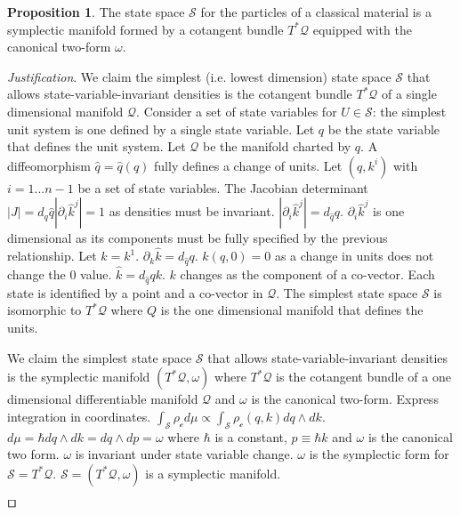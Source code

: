 \documentclass[smallextended]{svjour3}
\numberwithin{equation}{section}
\newenvironment{justification}{\emph{Justification}.}{\hfill\(\qed\)}
\theoremstyle{definition}
\newtheorem{prop}[equation]{Proposition}
\newenvironment{justification}{\emph{Justification}.}{\qed}
\begin{document}
\begin{prop}\label{prop:symplectic_manifold}
The state space $\mathcal{S}$ for the particles of a classical material is a symplectic manifold formed by a cotangent bundle $T^*\mathcal{Q}$ equipped with the canonical two-form $\omega$.
\end{prop}

\begin{justification}
	We claim the simplest (i.e. lowest dimension) state space $\mathcal{S}$ that allows state-variable-invariant densities is the cotangent bundle $T^*\mathcal{Q}$ of a single dimensional manifold $\mathcal{Q}$. Consider a set of state variables for $U \in \mathcal{S}$: the simplest unit system is one defined by a single state variable. Let $q$ be the state variable that defines the unit system. Let $\mathcal{Q}$ be the manifold charted by $q$. A diffeomorphism $\hat{q}=\hat{q}(q)$ fully defines a change of units. Let $(q,k^i)$ with $i=1...n-1$ be a set of state variables. The Jacobian determinant $|J| = d_q\hat{q} |\partial_i\hat{k}^j|=1$ as densities must be invariant. $|\partial_i \hat{k}^j| = d_{\hat{q}}q$. $\partial_i \hat{k}^j$ is one dimensional as its components must be fully specified by the previous relationship. Let $k=k^1$. $\partial_k \hat{k} = d_{\hat{q}}q$. $\hat{k}(q,0) = 0$ as a change in units does not change the $0$ value. $\hat{k} = d_{\hat{q}}q k$. $k$ changes as the component of a co-vector. Each state is identified by a point and a co-vector in $\mathcal{Q}$. The simplest state space $\mathcal{S}$ is isomorphic to $T^*\mathcal{Q}$ where $Q$ is the one dimensional manifold that defines the units.
	
	We claim the simplest state space $\mathcal{S}$ that allows state-variable-invariant densities is the symplectic manifold $(T^*\mathcal{Q}, \omega)$ where $T^*\mathcal{Q}$ is the cotangent bundle of a one dimensional differentiable manifold $\mathcal{Q}$ and $\omega$ is the canonical two-form. Express integration in coordinates. $\int_{\mathcal{S}} \rho_\mathcal{c} d\mu \propto \int_{\mathcal{S}} \rho_\mathcal{c}(q, k) dq \wedge dk$. $d\mu = \hbar dq \wedge dk = dq \wedge dp = \omega$ where $\hbar$ is a constant, $p\equiv \hbar k$  and $\omega$ is the canonical two form. $\omega$ is invariant under state variable change. $\omega$ is the symplectic form for $\mathcal{S}=T^*\mathcal{Q}$. $\mathcal{S} = (T^*\mathcal{Q}, \omega)$ is a symplectic manifold.
	

\end{justification}
\end{document}
